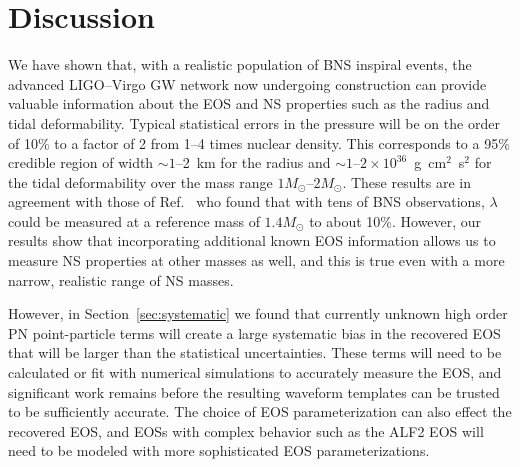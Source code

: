 \documentclass[twocolumn,prd,amssymb,aps,nofootinbib,showpacs,epsf]{revtex4}
\begin{document}
\section{Discussion}
\label{sec:discussion}

We have shown that, with a realistic population of BNS inspiral events, the advanced LIGO--Virgo GW network now undergoing construction can provide valuable information about the EOS and NS properties such as the radius and tidal deformability. Typical statistical errors in the pressure will be on the order of 10\% to a factor of 2 from 1--4 times nuclear density. This corresponds to a 95\% credible region of width $\sim 1$--2~km for the radius and $\sim 1$--$2\times 10^{36}$~g~cm$^2$~s$^2$ for the tidal deformability over the mass range $1M_\odot$--$2M_\odot$. These results are in agreement with those of Ref.~\cite{DelPozzoLiAgathos2013} who found that with tens of BNS observations, $\lambda$ could be measured at a reference mass of $1.4M_\odot$ to about 10\%. However, our results show that incorporating additional known EOS information allows us to measure NS properties at other masses as well, and this is true even with a more narrow, realistic range of NS masses.

However, in Section~\ref{sec:systematic} we found that currently unknown high order PN point-particle terms will create a large systematic bias in the recovered EOS that will be larger than the statistical uncertainties. These terms will need to be calculated or fit with numerical simulations to accurately measure the EOS, and significant work remains before the resulting waveform templates can be trusted to be sufficiently accurate. The choice of EOS parameterization can also effect the recovered EOS, and EOSs with complex behavior such as the ALF2 EOS will need to be modeled with more sophisticated EOS parameterizations. 

\end{document}
